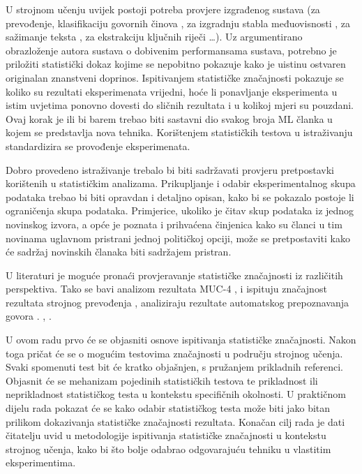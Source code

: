 U strojnom učenju  uvijek postoji potreba provjere izgrađenog sustava (za prevođenje, klasifikaciju govornih činova  \citep{pratt1977toward}, za izgradnju stabla međuovisnosti  \citep{collins2003head}, za sažimanje teksta , za ekstrakciju ključnih riječi  \dots). Uz argumentirano obrazloženje autora sustava o dobivenim performansama sustava, potrebno je priložiti statistički dokaz kojime se nepobitno pokazuje kako je uistinu ostvaren originalan znanstveni doprinos. Ispitivanjem statističke značajnosti pokazuje se koliko su rezultati eksperimenata vrijedni, hoće li ponavljanje eksperimenta u istim uvjetima ponovno dovesti do sličnih rezultata i u kolikoj mjeri su pouzdani. Ovaj korak je ili bi barem trebao biti sastavni dio svakog broja ML članka u kojem se predstavlja nova tehnika. Korištenjem statističkih testova u istraživanju standardizira se provođenje eksperimenata.

Dobro provedeno istraživanje trebalo bi biti sadržavati provjeru pretpostavki korištenih u statističkim analizama. Prikupljanje i odabir eksperimentalnog skupa podataka trebao bi biti opravdan i detaljno opisan, kako bi se pokazalo postoje li ograničenja skupa podataka. Primjerice, ukoliko je čitav skup podataka iz jednog novinskog izvora, a opće je poznata i prihvaćena činjenica kako su članci u tim novinama uglavnom pristrani jednoj političkoj opciji, može se pretpostaviti kako će sadržaj novinskih članaka biti sadržajem pristran. 

U literaturi je moguće pronaći provjeravanje statističke značajnosti iz različitih perspektiva. Tako se \citep{chinchor1992statistical} bavi analizom rezultata MUC-4 , \citep{koehn2004statistical} i \citep{zhang2004interpreting} ispituju značajnost rezultata strojnog prevođenja , \citep{bisani2004bootstrap} analiziraju rezultate automatskog prepoznavanja govora . \citep{berg2012empirical}, \citep{yeh2000more}.

U ovom radu prvo će se objasniti osnove ispitivanja statističke značajnosti. Nakon toga pričat će se o mogućim testovima značajnosti u području strojnog učenja. Svaki spomenuti test bit će kratko objašnjen, s pružanjem prikladnih referenci. Objasnit će se mehanizam pojedinih statističkih testova te prikladnost ili neprikladnost statističkog testa u kontekstu specifičnih okolnosti. U praktičnom dijelu rada pokazat će se kako odabir statističkog testa može biti jako bitan prilikom dokazivanja statističke značajnosti rezultata. Konačan cilj rada je dati čitatelju uvid u metodologije ispitivanja statističke značajnosti u kontekstu strojnog učenja, kako bi što bolje odabrao odgovarajuću tehniku u vlastitim eksperimentima.